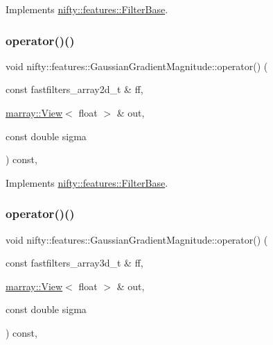 Implements \hyperlink{structnifty_1_1features_1_1FilterBase_a1c278e2b6ef0cb2a5bba2f758c6855e2}{nifty\+::features\+::\+Filter\+Base}.

\mbox{\label{structnifty_1_1features_1_1GaussianGradientMagnitude_a00efc1c411b58f0e212b26e3a4b9c06c}} 
\subsubsection{\texorpdfstring{operator()()}{operator()()}\hspace{0.1cm}{\footnotesize\ttfamily [1/2]}}
{\footnotesize\ttfamily void nifty\+::features\+::\+Gaussian\+Gradient\+Magnitude\+::operator() (\begin{DoxyParamCaption}\item[{const fastfilters\+\_\+array2d\+\_\+t \&}]{ff,  }\item[{\hyperlink{classandres_1_1View}{marray\+::\+View}$<$ float $>$ \&}]{out,  }\item[{const double}]{sigma }\end{DoxyParamCaption}) const\hspace{0.3cm}{\ttfamily [inline]}, {\ttfamily [virtual]}}



Implements \hyperlink{structnifty_1_1features_1_1FilterBase_a17c77d36dd765c5ec0b163102428656c}{nifty\+::features\+::\+Filter\+Base}.

\mbox{\label{structnifty_1_1features_1_1GaussianGradientMagnitude_a0c442cf0666188ae0dcea15adfa725b8}} 
\subsubsection{\texorpdfstring{operator()()}{operator()()}\hspace{0.1cm}{\footnotesize\ttfamily [2/2]}}
{\footnotesize\ttfamily void nifty\+::features\+::\+Gaussian\+Gradient\+Magnitude\+::operator() (\begin{DoxyParamCaption}\item[{const fastfilters\+\_\+array3d\+\_\+t \&}]{ff,  }\item[{\hyperlink{classandres_1_1View}{marray\+::\+View}$<$ float $>$ \&}]{out,  }\item[{const double}]{sigma }\end{DoxyParamCaption}) const\hspace{0.3cm}{\ttfamily [inline]}, {\ttfamily [virtual]}}



